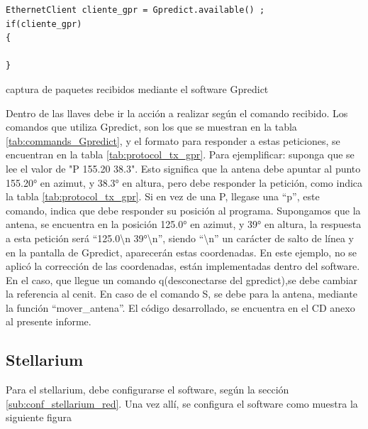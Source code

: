 \begin{listing}[ht!]
	\begin{verbatim}
EthernetClient cliente_gpr = Gpredict.available() ;
if(cliente_gpr)
{

}
	\end{verbatim}
\vspace{-5mm}
\caption{captura de paquetes recibidos mediante el software Gpredict}
\label{cod:cliente_gpr}
\end{listing}

Dentro de las llaves debe ir la acción a realizar según el comando recibido. Los comandos que utiliza Gpredict, son los que se muestran en la tabla \ref{tab:commands_Gpredict}, y el formato para responder a estas peticiones, se encuentran en la tabla \ref{tab:protocol_tx_gpr}.
Para ejemplificar: suponga que se lee el valor de "P 155.20 38.3". Esto significa que la antena debe apuntar al punto 155.20° en azimut, y 38.3° en altura, pero  debe responder la petición, como indica la tabla \ref{tab:protocol_tx_gpr}. Si en vez de una P, llegase una ``p'', este comando, indica que debe responder su posición al programa. Supongamos que la antena, se encuentra en la posición 125.0° en azimut, y 39° en altura, la respuesta a esta petición será ``125.0\textbackslash n 39°\textbackslash n'', siendo ``\textbackslash n'' un carácter de salto de línea  y en la pantalla de Gpredict, aparecerán estas coordenadas. En este ejemplo, no se aplicó la corrección de las coordenadas, están implementadas dentro del software. En el caso, que llegue un comando q(desconectarse del gpredict),se debe cambiar la referencia al cenit. En caso de el comando S, se debe para la antena, mediante la función ``mover\_antena''. El código desarrollado, se encuentra en el CD anexo al presente informe.




\subsection{Stellarium}

Para el stellarium, debe configurarse el software, según la sección \ref{sub:conf_stellarium_red}. Una vez allí, se configura el software como muestra la siguiente figura 

